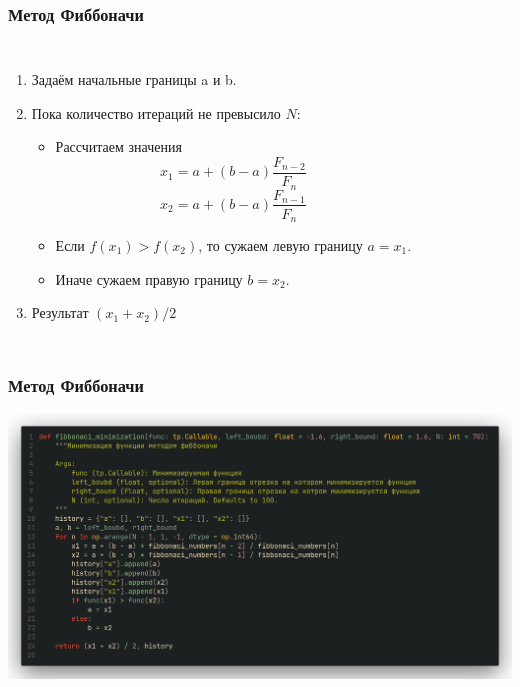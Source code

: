 \documentclass[9pt]{beamer}
\begin{document}
\begin{frame}
    \frametitle{Метод Фиббоначи}
    \begin{columns}
        
            \begin{enumerate}
            \item Задаём начальные границы a и b. 
            \item Пока количество итераций не превысило $N$:
            \begin{itemize}
                \item  Рассчитаем значения 
                $$
                    x_1 = a + (b - a) \frac{F_{n - 2}}{F_{n}}
                $$
                $$
                  x_2 = a + (b - a) \frac{F_{n - 1}}{F_{n}}
                $$
                \item Если $f(x_1) > f(x_2)$, то сужаем левую границу $a = x_1$.
                \item Иначе сужаем правую границу $b = x_2$.
            \end{itemize}
            \item Результат $(x_1 + x_2) / 2$
            
        \end{enumerate}   
    \end{columns} 
\end{frame}

\begin{frame}
    \frametitle{Метод Фиббоначи}
    \begin{center}
        \includegraphics[width = 1\textwidth]{code_fibb.png}    
    \end{center}
    
\end{frame}
\end{document}
